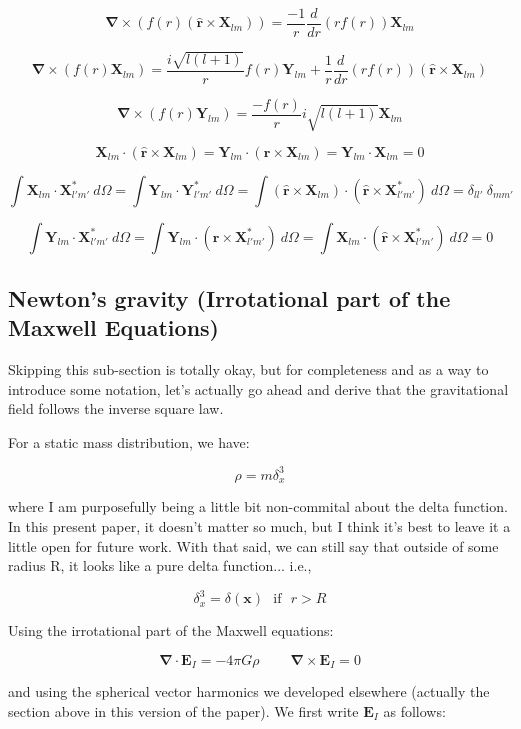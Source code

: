 \documentclass {article}
\renewcommand\vec{\mathbf}
\let\OldS\nabla
\renewcommand{\nabla}{\boldsymbol{\OldS}}
\let\OldHat\hat
\renewcommand{\hat}[1]{\OldHat{\mathbf{#1}}}
\begin{document}
$$\nabla \times \left( f(r) \left( \hat r \times \vec X_{lm} \right) \right) = \frac {-1} {r} \frac d {dr} \left( r f(r) \right) \vec X_{lm}$$

$$\nabla \times \left( f(r) \vec X_{lm} \right) = \frac {i \sqrt{l(l+1)} } {r} f(r) \vec Y_{lm} + \frac 1 r \frac d {dr} \left( r f(r) \right) \left( \hat r \times \vec X_{lm} \right)$$

$$\nabla \times \left( f(r) \vec Y_{lm} \right) = \frac {- f(r)} r i \sqrt {l (l+1)} \vec X_{lm}$$

$$ \vec X_{lm} \cdot ( \hat r \times \vec X_{lm}) = \vec Y_{lm} \cdot  ( \hat r \times \vec X_{lm}) = \vec Y_{lm} \cdot \vec X_{lm} = 0$$ 

$$ \int \vec X_{lm} \cdot \vec X_{l' m'}^* ~ d \Omega  = \int \vec Y_{lm} \cdot \vec Y_{l' m'}^* ~ d \Omega  = \int ( \hat r \times \vec X_{lm}) \cdot ( \hat r \times \vec X_{l' m'}^*) ~ d \Omega  = \delta_{ll'} ~ \delta_{m m'} $$

$$\int \vec Y_{lm} \cdot \vec X_{l' m'}^* ~ d \Omega = \int \vec Y_{lm} \cdot ( \hat r \times \vec X_{l' m'}^* ) ~ d \Omega  =  \int \vec X_{lm} \cdot ( \hat r \times \vec X_{l' m'}^* ) ~ d \Omega   = 0 $$

\newpage
\subsection{Newton's gravity (Irrotational part of the Maxwell Equations)}

Skipping this sub-section is totally okay, but for completeness and as a way to introduce some notation, let's actually go ahead and derive that the gravitational field follows the inverse square law. 

For a static mass distribution, we have:

$$\rho = m \delta^3_x  $$

where I am purposefully being a little bit non-commital about the delta function. In this present paper, it doesn't matter so much, but I think it's best to leave it a little open for future work. With that said, we can still say that outside of some radius R, it looks like a pure delta function... i.e.,

$$\delta^3_x = \delta(\vec x) ~~~ \textrm{if} ~~~ r > R $$

Using the irrotational part of the Maxwell equations:

$$\nabla \cdot \vec{E}_I = -4 \pi G \rho ~~~~~~~~~~ \nabla \times \vec{E}_I = 0$$

and using the spherical vector harmonics we developed elsewhere (actually the section above in this version of the paper).  We first write $\vec E_I $ as follows:
\end{document}
